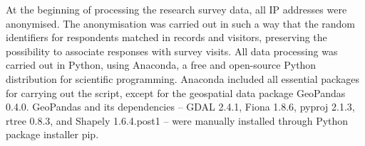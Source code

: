 
At the beginning of processing the research survey data, all IP addresses were anonymised. The anonymisation was carried out in such a way that the random identifiers for respondents matched in records and visitors, preserving the possibility to associate responses with survey visits. All data processing was carried out in Python, using Anaconda, a free and open-source Python distribution for scientific programming. Anaconda included all essential packages for carrying out the script, except for the geospatial data package GeoPandas 0.4.0. GeoPandas and its dependencies -- GDAL 2.4.1, Fiona 1.8.6, pyproj 2.1.3, rtree 0.8.3, and Shapely 1.6.4.post1 -- were manually installed through Python package installer pip. 

